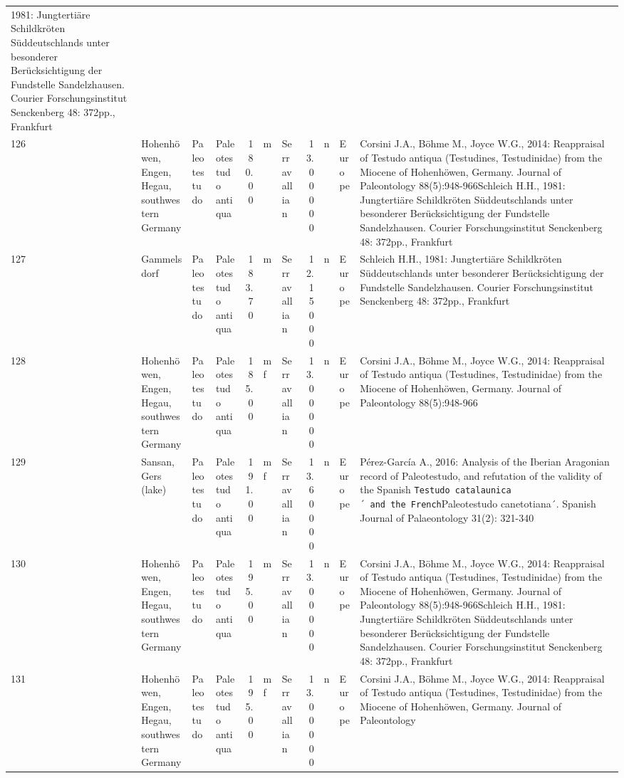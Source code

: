 \documentclass[]{article}
\begin{document}
\begin{longtable}[]{@{}llllrllrlll@{}}
1981: Jungtertiäre Schildkröten Süddeutschlands unter besonderer
Berücksichtigung der Fundstelle Sandelzhausen. Courier
Forschungsinstitut Senckenberg 48: 372pp., Frankfurt\tabularnewline
126 & Hohenhöwen, Engen, Hegau, southwestern Germany & Paleotestudo &
Paleotestudo antiqua & 180.00 & m & Serravallian & 13.00000 & n & Europe
& Corsini J.A., Böhme M., Joyce W.G., 2014: Reappraisal of Testudo
antiqua (Testudines, Testudinidae) from the Miocene of Hohenhöwen,
Germany. Journal of Paleontology 88(5):948-966\textbar{}Schleich H.H.,
1981: Jungtertiäre Schildkröten Süddeutschlands unter besonderer
Berücksichtigung der Fundstelle Sandelzhausen. Courier
Forschungsinstitut Senckenberg 48: 372pp., Frankfurt\tabularnewline
127 & Gammelsdorf & Paleotestudo & Paleotestudo antiqua & 183.70 & m &
Serravallian & 12.15000 & n & Europe & Schleich H.H., 1981: Jungtertiäre
Schildkröten Süddeutschlands unter besonderer Berücksichtigung der
Fundstelle Sandelzhausen. Courier Forschungsinstitut Senckenberg 48:
372pp., Frankfurt\tabularnewline
128 & Hohenhöwen, Engen, Hegau, southwestern Germany & Paleotestudo &
Paleotestudo antiqua & 185.00 & mf & Serravallian & 13.00000 & n &
Europe & Corsini J.A., Böhme M., Joyce W.G., 2014: Reappraisal of
Testudo antiqua (Testudines, Testudinidae) from the Miocene of
Hohenhöwen, Germany. Journal of Paleontology
88(5):948-966\tabularnewline
129 & Sansan, Gers (lake) & Paleotestudo & Paleotestudo antiqua & 191.00
& mf & Serravallian & 13.60000 & n & Europe & Pérez-García A., 2016:
Analysis of the Iberian Aragonian record of Paleotestudo, and refutation
of the validity of the Spanish
\texttt{Testudo\ catalaunica´\ and\ the\ French}Paleotestudo
canetotiana´. Spanish Journal of Palaeontology 31(2):
321-340\tabularnewline
130 & Hohenhöwen, Engen, Hegau, southwestern Germany & Paleotestudo &
Paleotestudo antiqua & 195.00 & m & Serravallian & 13.00000 & n & Europe
& Corsini J.A., Böhme M., Joyce W.G., 2014: Reappraisal of Testudo
antiqua (Testudines, Testudinidae) from the Miocene of Hohenhöwen,
Germany. Journal of Paleontology 88(5):948-966\textbar{}Schleich H.H.,
1981: Jungtertiäre Schildkröten Süddeutschlands unter besonderer
Berücksichtigung der Fundstelle Sandelzhausen. Courier
Forschungsinstitut Senckenberg 48: 372pp., Frankfurt\tabularnewline
131 & Hohenhöwen, Engen, Hegau, southwestern Germany & Paleotestudo &
Paleotestudo antiqua & 195.00 & mf & Serravallian & 13.00000 & n &
Europe & Corsini J.A., Böhme M., Joyce W.G., 2014: Reappraisal of
Testudo antiqua (Testudines, Testudinidae) from the Miocene of
Hohenhöwen, Germany. Journal of Paleontology

\end{longtable}
\end{document}
